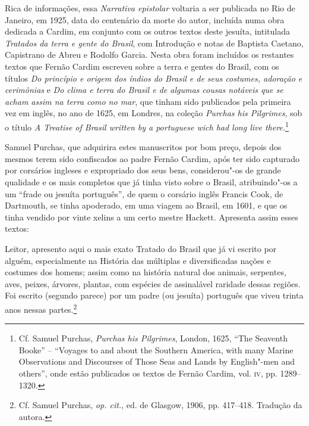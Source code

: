 Rica de informações, essa \textit{Narrativa epistolar} voltaria a ser publicada no Rio de Janeiro, em 1925, data do centenário da morte do autor, incluída numa obra
dedicada a Cardim, em conjunto com os outros textos deste jesuíta,
intitulada \textit{Tratados da terra e gente do Brasil}, com Introdução
e notas de Baptista Caetano, Capistrano de Abreu e Rodolfo Garcia.
Nesta obra foram incluídos os restantes textos que Fernão Cardim
escreveu sobre a terra e gentes do Brasil, com os títulos \textit{Do
princípio e origem dos índios do Brasil e de seus costumes, adoração e
cerimônias} e \textit{Do clima e terra do Brasil e de algumas cousas
notáveis que se acham assim na terra como no mar}, que tinham sido
publicados pela primeira vez em inglês, no ano de 1625, em Londres, na
coleção \textit{Purchas his Pilgrimes}, sob o título \textit{A
Treatise of Brasil written by a portuguese wich had long live there.}\footnote{ Cf. 
Samuel Purchas, \textit{Purchas his Pilgrimes}, 
London, 1625, ``The Seaventh Booke'' -- ``Voyages to and about the
Southern America, with many Marine Observations and Discourses of Those
Seas and Lands by English"-men and others'', onde estão publicados os
textos de Fernão Cardim, vol. \textsc{iv}, pp. 1289--1320.} 

Samuel Purchas, que adquirira estes manuscritos por bom preço, depois
dos mesmos terem sido confiscados ao padre Fernão Cardim, após ter sido
capturado por corsários ingleses e expropriado dos seus bens,
considerou"-os de grande qualidade e os mais completos que já tinha
visto sobre o Brasil, atribuindo"-os a um ``frade ou jesuíta português'',
de quem o corsário inglês Francis Cook, de Dartmouth, se tinha
apoderado, em uma viagem ao Brasil, em 1601, e que os tinha vendido por
vinte xelins a um certo mestre Hackett. Apresenta assim esses textos:

\begin{hedraquote}
Leitor, apresento aqui o mais exato Tratado do Brasil que
já vi escrito por alguém, especialmente na História das múltiplas e
diversificadas nações e costumes dos homens; assim como na história
natural dos animais, serpentes, aves, peixes, árvores, plantas, com
espécies de assinalável raridade dessas regiões. Foi escrito (segundo
parece) por um padre (ou jesuíta) português que viveu trinta anos
nessas partes.\footnote{ Cf. Samuel Purchas, \textit{op. cit.}, 
ed. de Glasgow, 1906, pp. 417--418. Tradução da autora.}
\end{hedraquote}

